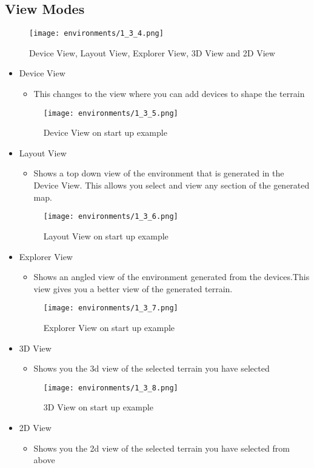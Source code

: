 \documentclass[../main.tex]{subfiles}
\begin{document}
\subsection{View Modes}
\begin{figure}[H]
\texttt{[image: environments/1\_3\_4.png]}
\caption{Device View, Layout View, Explorer View, 3D View and 2D View}
\end{figure}
\begin{itemize}
    \item Device View
    \begin{itemize}
        \item This changes to the view where you can add devices to shape the terrain
    \end{itemize}
    \begin{figure}[H]
    \texttt{[image: environments/1\_3\_5.png]}
    \caption{Device View on start up example}
    \end{figure}
    \item Layout View
    \begin{itemize}
        \item Shows a top down view of the environment that is generated in the Device View. This allows you select and view any section of the generated map.
    \end{itemize}
    \begin{figure}[H]
    \texttt{[image: environments/1\_3\_6.png]}
    \caption{Layout View on start up example}
    \end{figure}
    \item Explorer View
    \begin{itemize}
        \item Shows an angled view of the environment generated from the devices.This view gives you a better view of the generated terrain.
    \end{itemize}
    \begin{figure}[H]
    \texttt{[image: environments/1\_3\_7.png]}
    \caption{Explorer View on start up example}
    \end{figure}
    \item 3D View
    \begin{itemize}
        \item Shows you the 3d view of the selected terrain you have selected
    \end{itemize}
    \begin{figure}[H]
    \texttt{[image: environments/1\_3\_8.png]}
    \caption{3D View on start up example}
    \end{figure}
    \item 2D View
    \begin{itemize}
        \item Shows you the 2d view of the selected terrain you have selected from above
    \end{itemize}
\end{itemize}
\end{document}
